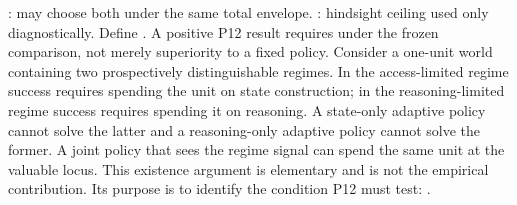 \markdownRendererUlItem {}: may choose both under the same total envelope.\markdownRendererUlItemEnd 
\markdownRendererUlItem {}: hindsight ceiling used only diagnostically.\markdownRendererUlItemEnd 
\markdownRendererUlEndTight \markdownRendererInterblockSeparator
{}Define\markdownRendererInterblockSeparator
{}.\markdownRendererInterblockSeparator
{}A positive P12 result requires  under the frozen comparison, not merely superiority to a fixed policy.\markdownRendererInterblockSeparator
{}Consider a one-unit world containing two prospectively distinguishable regimes. In the access-limited regime success requires spending the unit on state construction; in the reasoning-limited regime success requires spending it on reasoning. A state-only adaptive policy cannot solve the latter and a reasoning-only adaptive policy cannot solve the former. A joint policy that sees the regime signal can spend the same unit at the valuable locus.\markdownRendererInterblockSeparator
{}This existence argument is elementary and is not the empirical contribution. Its purpose is to identify the condition P12 must test: .
\markdownRendererSectionEnd 
\markdownRendererSectionEnd \markdownRendererDocumentEnd